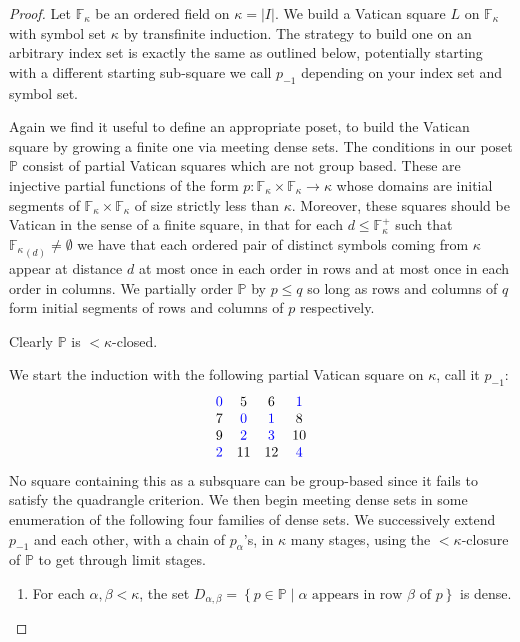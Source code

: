 \documentclass[12pt,a4paper]{article}
\newcommand{\F}{\mathbb{F}}
\newcommand{\To}{\longrightarrow}
\newcommand{\st}{\; | \;}
\newcommand{\set}[2]{\left\{#1\st #2 \right\}}
\renewcommand{\P}{\mathbb{P}}
\begin{document}
\begin{proof}
Let $\F_\kappa$ be an ordered field on $\kappa=|I|$.
We build a Vatican square $L$ on $\F_\kappa$ with symbol set $\kappa$ by transfinite induction. The strategy to build one on an arbitrary index set is exactly the same as outlined below, potentially starting with a different starting sub-square we call $p_{-1}$ depending on your index set and symbol set.

Again we find it useful to define an appropriate poset, to build the Vatican square by growing a finite one via meeting dense sets. The conditions in our poset $\P$ consist of partial Vatican squares which are not group based. These are injective partial functions of the form $p:\F_\kappa \times \F_\kappa\To\kappa$ whose domains are initial segments of $\F_\kappa \times \F_\kappa$ of size strictly less than $\kappa$. Moreover, these squares should be Vatican in the sense of a finite square, in that for each $d\leq \F_\kappa^+$ such that ${\F_\kappa}_{(d)}\neq\emptyset$ we have that each ordered pair of distinct symbols coming from $\kappa$ appear at distance $d$ at most once in each order in rows and at most once in each order in columns. We partially order $\P$ by $p \leq q$ so long as rows and columns of $q$ form initial segments of rows and columns of $p$ respectively.

Clearly $\P$ is $<\kappa$-closed.

We start the induction with the following partial Vatican square on $\kappa$, call it $p_{-1}$:
$$\begin{array}{cccc}
	\color{blue} 0 & 5 & 6 & \color{blue} 1 \\ 
	7 & \color{blue} 0 & \color{blue}1 & 8  \\
	9 & \color{blue}2 & \color{blue} 3 & 10 \\
	\color{blue} 2 & 11 & 12 & \color{blue} 4 
\end{array}$$
No square containing this as a subsquare can be group-based since it fails to satisfy the quadrangle criterion.
We then begin meeting dense sets in some enumeration of the following four families of dense sets. We successively extend $p_{-1}$ and each other, with a chain of $p_\alpha$'s, in $\kappa$ many stages, using the $<\kappa$-closure of $\P$ to get through limit stages. 

\begin{enumerate}
	\item For each $\alpha, \beta <\kappa$, the set $D_{\alpha,\beta}=\set{p \in \P}{\alpha \text{ appears in row } \beta \text{ of } p}$ is dense.
	

\end{enumerate}
\end{proof}
\end{document}
